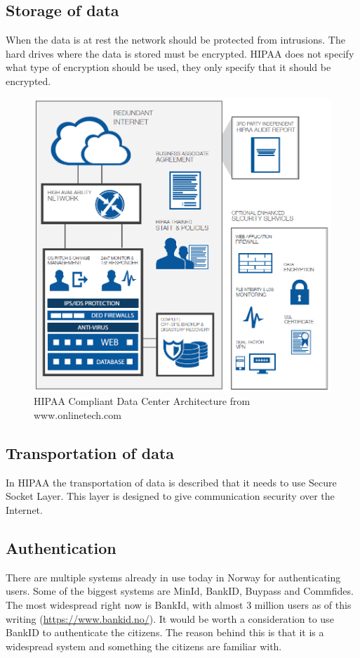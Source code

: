 \subsection{Storage of data}
When the data is at rest the network should be protected from intrusions.
The hard drives where the data is stored must be encrypted. \cite{Encryption}
HIPAA does not specify what type of encryption should be used, they only specify that it should be encrypted.

\begin{figure}[H]
\centering
\includegraphics[scale=0.50]{../Figures/hipaa.png}
\caption{HIPAA Compliant Data Center Architecture from www.onlinetech.com}
\label{figure:HIPAA}
\end{figure}

\subsection{Transportation of data}
In HIPAA the transportation of data is described that it needs to use Secure Socket Layer. 
This layer is designed to give communication security over the Internet. \cite{SSL}

\subsection{Authentication}
There are multiple systems already in use today in Norway for authenticating users. 
Some of the biggest systems are MinId, BankID, Buypass and Commfides.
The most widespread right now is BankId, with almost 3 million users as of this writing (\href{https://www.bankid.no/}{https://www.bankid.no/}).
It would be worth a consideration to use BankID to authenticate the citizens. 
The reason behind this is that it is a widespread system and something the citizens are familiar with. 

